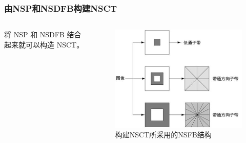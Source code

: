 \documentclass[10pt,aspectratio=43,mathserif]{beamer}
\begin{document}
\begin{frame}
		  \frametitle{\textbf{由NSP和NSDFB构建NSCT}}
            \begin{columns}
                \footnotesize
将 NSP 和 NSDFB 结合起来就可以构造 NSCT。

                \begin{figure}[!t]
                    \centering
                    \includegraphics[width=1.1\textwidth]{./figures/nsct/NSCT-NSFB.png}
                    \caption{构建NSCT所采用的NSFB结构}
                \end{figure}
        \end{columns}
    \end{frame}
\end{document}
